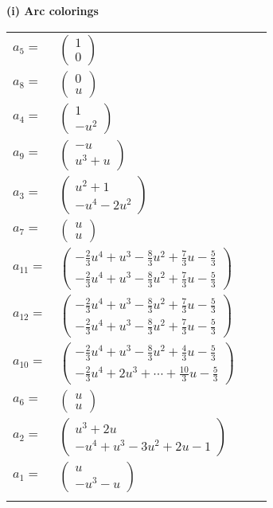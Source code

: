 \documentclass[1p]{elsarticle_modified}
\theoremstyle{definition}
\begin{document}
\flushleft \textbf{(i) Arc colorings}\\
\begin{tabular}{m{7pt} m{180pt} m{7pt} m{180pt} }
\flushright $a_{5}=$&$\begin{pmatrix}1\\0\end{pmatrix}$ \\
\flushright $a_{8}=$&$\begin{pmatrix}0\\u\end{pmatrix}$ \\
\flushright $a_{4}=$&$\begin{pmatrix}1\\- u^2\end{pmatrix}$ \\
\flushright $a_{9}=$&$\begin{pmatrix}- u\\u^3+u\end{pmatrix}$ \\
\flushright $a_{3}=$&$\begin{pmatrix}u^2+1\\- u^4-2 u^2\end{pmatrix}$ \\
\flushright $a_{7}=$&$\begin{pmatrix}u\\u\end{pmatrix}$ \\
\flushright $a_{11}=$&$\begin{pmatrix}-\frac{2}{3} u^4+u^3-\frac{8}{3} u^2+\frac{7}{3} u-\frac{5}{3}\\-\frac{2}{3} u^4+u^3-\frac{8}{3} u^2+\frac{7}{3} u-\frac{5}{3}\end{pmatrix}$ \\
\flushright $a_{12}=$&$\begin{pmatrix}-\frac{2}{3} u^4+u^3-\frac{8}{3} u^2+\frac{7}{3} u-\frac{5}{3}\\-\frac{2}{3} u^4+u^3-\frac{8}{3} u^2+\frac{7}{3} u-\frac{5}{3}\end{pmatrix}$ \\
\flushright $a_{10}=$&$\begin{pmatrix}-\frac{2}{3} u^4+u^3-\frac{8}{3} u^2+\frac{4}{3} u-\frac{5}{3}\\-\frac{2}{3} u^4+2 u^3+\cdots+\frac{10}{3} u-\frac{5}{3}\end{pmatrix}$ \\
\flushright $a_{6}=$&$\begin{pmatrix}u\\u\end{pmatrix}$ \\
\flushright $a_{2}=$&$\begin{pmatrix}u^3+2 u\\- u^4+u^3-3 u^2+2 u-1\end{pmatrix}$ \\
\flushright $a_{1}=$&$\begin{pmatrix}u\\- u^3- u\end{pmatrix}$\\&\end{tabular}
\end{document}
